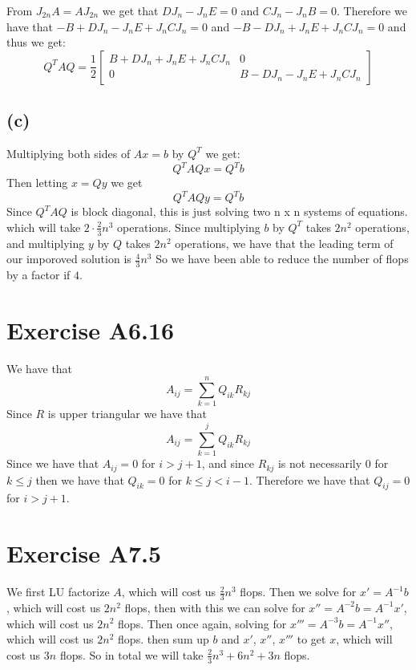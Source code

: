 From $J_{2n}A=AJ_{2n}$ we get that $DJ_n-J_nE=0$ and 
$CJ_n-J_nB=0$. Therefore we have that $-B+DJ_n-J_nE+J_nCJ_n=0$
and $-B-DJ_n+J_nE+J_nCJ_n=0$ and thus we get:
$$Q^TAQ=\frac{1}{2} \begin{bmatrix}
        B+DJ_n+J_nE+J_nCJ_n & 0\\
        0 & B-DJ_n-J_nE+J_nCJ_n
    \end{bmatrix}$$
\subsection*{(c)}
Multiplying both sides of $Ax=b$ by $Q^T$ we get:
$$Q^TAQx=Q^Tb$$
Then letting $x=Qy$ we get
$$Q^TAQy=Q^Tb$$
Since $Q^TAQ$ is block diagonal, this is just solving
two n x n systems of equations. which will take $2\cdot\frac{2}{3}n^3$
operations. Since multiplying $b$ by $Q^T$ takes $2n^2$ operations,
and multiplying $y$ by $Q$ takes $2n^2$ operations, we have that
the leading term of our imporoved solution is $\frac{4}{3}n^3$ So
we have been able to reduce the number of flops by a factor if $4$.
\section*{Exercise A6.16}
We have that 
$$A_{ij}=\sum_{k=1}^n Q_{ik}R_{kj}$$
Since $R$ is upper triangular we have that 
$$A_{ij}=\sum_{k=1}^j Q_{ik}R_{kj}$$
Since we have that $A_{ij}=0$ for $i>j+1$, and since $R_{kj}$
is not necessarily $0$ for $k\leq j$ then we have that
$Q_{ik}=0$ for $k\leq j<i-1$. Therefore we have that
$Q_{ij}=0$ for $i>j+1$.  

\section*{Exercise A7.5}
We first LU factorize $A$, which will cost us $\frac{2}{3}n^3$ flops. 
Then we solve for $x'=A^{-1}b$, which will cost us $2n^2$ flops, then with this we can
solve for $x''=A^{-2}b=A^{-1}x'$, which will cost us $2n^2$ flops.
Then once again, solving for $x'''=A^{-3}b=A^{-1}x''$, which will cost us $2n^2$ flops.
then sum up $b$ and $x'$, $x''$, $x'''$ to get $x$, which will cost us 
$3n$ flops. So in total we will take $\boxed{\frac{2}{3}n^3+6n^2+3n}$ flops.
